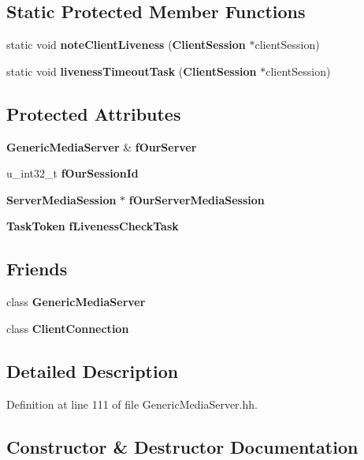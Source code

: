 \subsection*{Static Protected Member Functions}
\begin{DoxyCompactItemize}
\item 
static void {\bf note\+Client\+Liveness} ({\bf Client\+Session} $\ast$client\+Session)
\item 
static void {\bf liveness\+Timeout\+Task} ({\bf Client\+Session} $\ast$client\+Session)
\end{DoxyCompactItemize}
\subsection*{Protected Attributes}
\begin{DoxyCompactItemize}
\item 
{\bf Generic\+Media\+Server} \& {\bf f\+Our\+Server}
\item 
u\+\_\+int32\+\_\+t {\bf f\+Our\+Session\+Id}
\item 
{\bf Server\+Media\+Session} $\ast$ {\bf f\+Our\+Server\+Media\+Session}
\item 
{\bf Task\+Token} {\bf f\+Liveness\+Check\+Task}
\end{DoxyCompactItemize}
\subsection*{Friends}
\begin{DoxyCompactItemize}
\item 
class {\bf Generic\+Media\+Server}
\item 
class {\bf Client\+Connection}
\end{DoxyCompactItemize}


\subsection{Detailed Description}


Definition at line 111 of file Generic\+Media\+Server.\+hh.



\subsection{Constructor \& Destructor Documentation}
